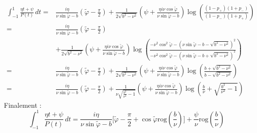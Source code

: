 \begin{equation*}
\begin{split}
\int_{-1}^1 \frac{\eta t+ \psi}{P(t)}\, dt =&\frac{i\eta}{\nu\sin\tilde{\varphi}-b}(\tilde{\varphi}-\frac{\pi}{2})+\frac{1}{2\sqrt{b^2-\nu^2}}\left(\psi+\frac{\eta i\nu\cos\tilde{\varphi}}{\nu\sin\tilde{\varphi}-b}\right)\log\left(\frac{(1-p_+)(1+p_-)}{(1-p_-)(1+p_+)}\right)\\
=&\frac{i\eta}{\nu\sin\tilde{\varphi}-b}(\tilde{\varphi}-\frac{\pi}{2})\\
&+\frac{1}{2\sqrt{b^2-\nu^2}}\left(\psi+\frac{\eta i\nu\cos\tilde{\varphi}}{\nu\sin\tilde{\varphi}-b}\right)\log\left(\frac{-\nu^2\cos^2\tilde{\varphi}-(\nu\sin\tilde{\varphi}-b-\sqrt{b^2-\nu^2})^2}{-\nu^2\cos^2\tilde{\varphi}-(\nu\sin\tilde{\varphi}-b+\sqrt{b^2-\nu^2})^2}\right)\\
=&\frac{i\eta}{\nu\sin\tilde{\varphi}-b}(\tilde{\varphi}-\frac{\pi}{2})+\frac{1}{2\sqrt{b^2-\nu^2}}\left(\psi+\frac{\eta i\nu\cos\tilde{\varphi}}{\nu\sin\tilde{\varphi}-b}\right)\log\left(\frac{b+\sqrt{b^2-\nu^2}}{b-\sqrt{b^2-\nu^2}}\right)\\
=&\frac{i\eta}{\nu\sin\tilde{\varphi}-b}(\tilde{\varphi}-\frac{\pi}{2})+\frac{1}{\nu\sqrt{\frac{b^2}{\nu^2}-1}}\left(\psi+\frac{\eta i\nu\cos\tilde{\varphi}}{\nu\sin\tilde{\varphi}-b}\right)\log\left(\frac{b}{\nu}+\sqrt{\frac{b^2}{\nu^2}-1}\right)
\end{split}
\end{equation*}
Finalement :
\begin{equation}
\int_{-1}^1 \frac{\eta t+ \psi}{P(t)}\, dt =\frac{i\eta}{\nu\sin\tilde{\varphi}-b}\lbrack\tilde{\varphi}-\frac{\pi}{2}+\cos\tilde{\varphi} \mbox{rog}(\frac{b}{\nu})\rbrack+\frac{\psi}{\nu}\mbox{rog}(\frac{b}{\nu})
\label{intP}
\end{equation}